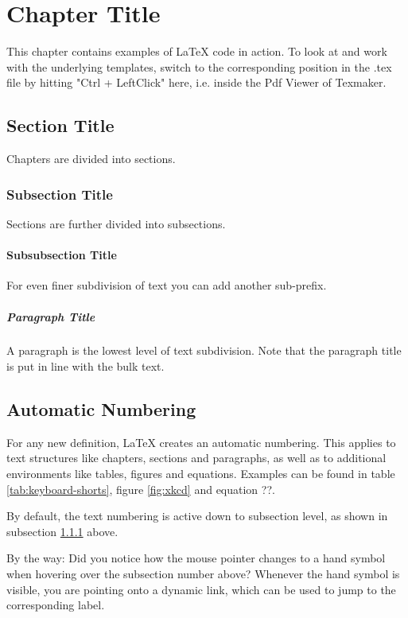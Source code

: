 \chapter{Chapter Title}

This chapter contains examples of LaTeX code in action.
To look at and work with the underlying templates, switch to the corresponding position in the .tex file by hitting "Ctrl + LeftClick" here, i.e. inside the Pdf Viewer of Texmaker.

\section{Section Title}

Chapters are divided into sections.

\subsection{Subsection Title}
\label{text:subsection}
Sections are further divided into subsections.

\subsubsection{Subsubsection Title}
For even finer subdivision of text you can add another sub-prefix.

\paragraph{Paragraph Title}

A paragraph is the lowest level of text subdivision. 
Note that the paragraph title is put in line with the bulk text.

\section{Automatic Numbering}

For any new definition, LaTeX creates an automatic numbering.
This applies to text structures like chapters, sections and paragraphs, as well as to additional environments like tables, figures and equations.
Examples can be found in table \ref{tab:keyboard-shorts}, figure \ref{fig:xkcd} and equation ??.

By default, the text numbering is active down to subsection level, as shown in subsection \ref{text:subsection} above.

By the way: Did you notice how the mouse pointer changes to a hand symbol when hovering over the subsection number above?
Whenever the hand symbol is visible, you are pointing onto a dynamic link, which can be used to jump to the corresponding label.

